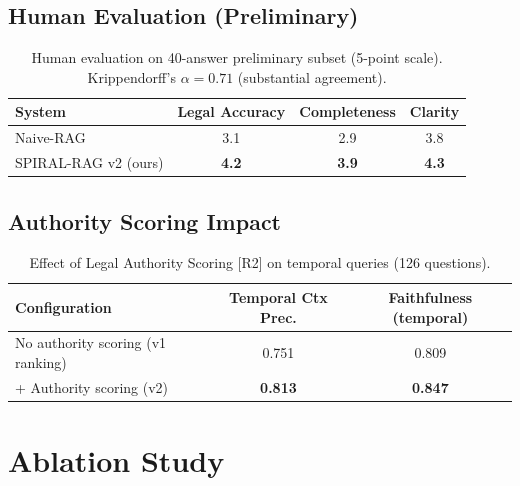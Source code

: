 \documentclass[12pt,a4paper]{article}
\begin{document}
\subsection{Human Evaluation (Preliminary)}

\begin{table}[H]
\centering
\caption{Human evaluation on 40-answer preliminary subset (5-point scale).
Krippendorff's $\alpha = 0.71$ (substantial agreement).}
\label{tab:human_eval}
\begin{tabular}{lccc}
\toprule
\textbf{System} & \textbf{Legal Accuracy} & \textbf{Completeness} & \textbf{Clarity} \\
\midrule
Naive-RAG             & 3.1 & 2.9 & 3.8 \\
SPIRAL-RAG v2 (ours)  & \textbf{4.2} & \textbf{3.9} & \textbf{4.3} \\
\bottomrule
\end{tabular}
\end{table}

\subsection{Authority Scoring Impact}

\begin{table}[H]
\centering
\caption{Effect of Legal Authority Scoring [R2] on temporal queries (126 questions).}
\label{tab:authority}
\begin{tabular}{lcc}
\toprule
\textbf{Configuration} & \textbf{Temporal Ctx Prec.} & \textbf{Faithfulness (temporal)} \\
\midrule
No authority scoring (v1 ranking) & 0.751 & 0.809 \\
+ Authority scoring (v2)          & \textbf{0.813} & \textbf{0.847} \\
\bottomrule
\end{tabular}
\end{table}

\section{Ablation Study}
\label{sec:ablation}
\end{document}
